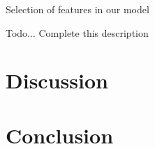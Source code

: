 \documentclass[11pt]{article}
\begin{document}
\begin{algorithm}
\caption{Selection of features in our model}
\begin{algorithmic}[1]
\State Todo... Complete this description
\EndProcedure
\end{algorithmic}
\end{algorithm}


\section{Discussion}


\section{Conclusion}



\end{document}
